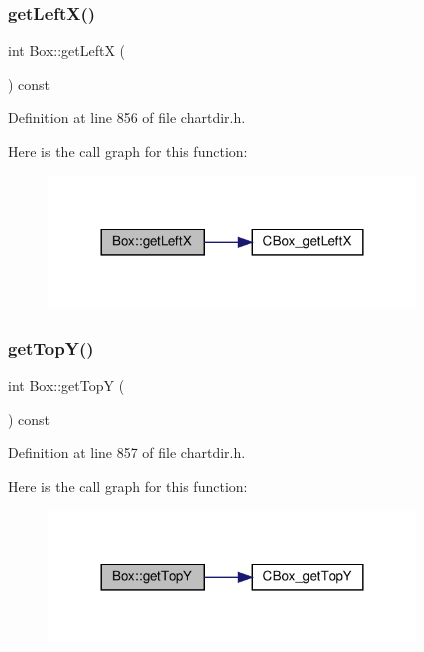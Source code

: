 \subsubsection{\texorpdfstring{get\+Left\+X()}{getLeftX()}}
{\footnotesize\ttfamily int Box\+::get\+LeftX (\begin{DoxyParamCaption}{ }\end{DoxyParamCaption}) const\hspace{0.3cm}{\ttfamily [inline]}}



Definition at line 856 of file chartdir.\+h.

Here is the call graph for this function\+:
\nopagebreak
\begin{figure}[H]
\begin{center}
\leavevmode
\includegraphics[width=276pt]{class_box_a8162cf06a56275fd6a20a5295eac68cd_cgraph}
\end{center}
\end{figure}
\mbox{\label{class_box_af7f965a92d7f745597189882ac76886c}} 
\subsubsection{\texorpdfstring{get\+Top\+Y()}{getTopY()}}
{\footnotesize\ttfamily int Box\+::get\+TopY (\begin{DoxyParamCaption}{ }\end{DoxyParamCaption}) const\hspace{0.3cm}{\ttfamily [inline]}}



Definition at line 857 of file chartdir.\+h.

Here is the call graph for this function\+:
\nopagebreak
\begin{figure}[H]
\begin{center}
\leavevmode
\includegraphics[width=276pt]{class_box_af7f965a92d7f745597189882ac76886c_cgraph}
\end{center}
\end{figure}
\mbox{\label{class_box_a4feb8db8b03bd71a7235d33ec96c3725}} 
